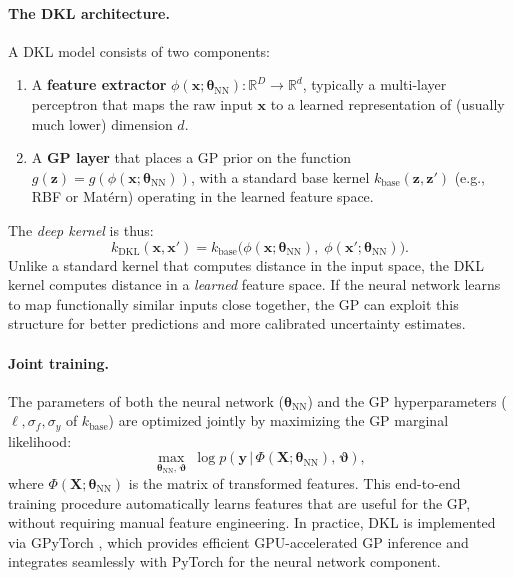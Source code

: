\documentclass[11pt,a4paper]{report}
\newcommand{\x}{\bm{x}}
\newcommand{\z}{\bm{z}}
\newcommand{\X}{\bm{X}}
\newcommand{\R}{\mathbb{R}}
\begin{document}
\paragraph{The DKL architecture.}
A DKL model consists of two components:
\begin{enumerate}[itemsep=2pt]
\item A \textbf{feature extractor} $\phi(\x; \bm{\theta}_\mathrm{NN})\colon \R^D \to \R^d$, typically a multi-layer perceptron that maps the raw input $\x$ to a learned representation of (usually much lower) dimension $d$.
\item A \textbf{GP layer} that places a GP prior on the function $g(\z) = g(\phi(\x; \bm{\theta}_\mathrm{NN}))$, with a standard base kernel $k_\mathrm{base}(\z, \z')$ (e.g., RBF or Mat\'ern) operating in the learned feature space.
\end{enumerate}
The \emph{deep kernel} is thus:
\begin{equation}
k_\mathrm{DKL}(\x, \x') = k_\mathrm{base}\bigl(\phi(\x; \bm{\theta}_\mathrm{NN}),\; \phi(\x'; \bm{\theta}_\mathrm{NN})\bigr).
\label{eq:dkl_kernel}
\end{equation}
Unlike a standard kernel that computes distance in the input space, the DKL kernel computes distance in a \emph{learned} feature space.  If the neural network learns to map functionally similar inputs close together, the GP can exploit this structure for better predictions and more calibrated uncertainty estimates.

\paragraph{Joint training.}
The parameters of both the neural network ($\bm{\theta}_\mathrm{NN}$) and the GP hyperparameters ($\ell, \sigma_f, \sigma_y$ of $k_\mathrm{base}$) are optimized jointly by maximizing the GP marginal likelihood:
\begin{equation}
\max_{\bm{\theta}_\mathrm{NN},\, \bm{\vartheta}} \; \log p(\bm{y}\,|\,\Phi(\X; \bm{\theta}_\mathrm{NN}),\, \bm{\vartheta}),
\end{equation}
where $\Phi(\X; \bm{\theta}_\mathrm{NN})$ is the matrix of transformed features.  This end-to-end training procedure automatically learns features that are useful for the GP, without requiring manual feature engineering.  In practice, DKL is implemented via GPyTorch \citep{gardner2018gpytorch}, which provides efficient GPU-accelerated GP inference and integrates seamlessly with PyTorch for the neural network component.
\end{document}
